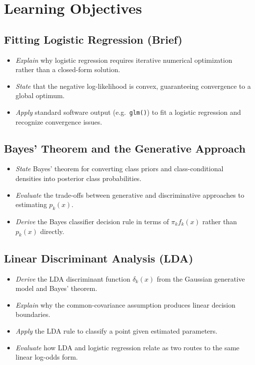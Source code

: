 \documentclass[11pt]{article}
\begin{document}
\section{Learning Objectives}

\subsection{Fitting Logistic Regression (Brief)}
\begin{itemize}
\item \emph{Explain} why logistic regression requires iterative numerical optimization rather than a closed-form solution.
\item \emph{State} that the negative log-likelihood is convex, guaranteeing convergence to a global optimum.
\item \emph{Apply} standard software output (e.g.\ \texttt{glm()}) to fit a logistic regression and recognize convergence issues.
\end{itemize}

\subsection{Bayes' Theorem and the Generative Approach}
\begin{itemize}
\item \emph{State} Bayes' theorem for converting class priors and class-conditional densities into posterior class probabilities.
\item \emph{Evaluate} the trade-offs between generative and discriminative approaches to estimating $p_k(x)$.
\item \emph{Derive} the Bayes classifier decision rule in terms of $\pi_k f_k(x)$ rather than $p_k(x)$ directly.
\end{itemize}

\subsection{Linear Discriminant Analysis (LDA)}
\begin{itemize}
\item \emph{Derive} the LDA discriminant function $\delta_k(x)$ from the Gaussian generative model and Bayes' theorem.
\item \emph{Explain} why the common-covariance assumption produces linear decision boundaries.
\item \emph{Apply} the LDA rule to classify a point given estimated parameters.
\item \emph{Evaluate} how LDA and logistic regression relate as two routes to the same linear log-odds form.
\end{itemize}
\end{document}
